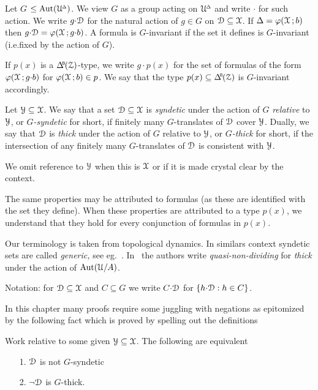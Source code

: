 Let \emph{$G$\/} $\le{\rm Aut}(\EuScript U\kern-.2ex^{\scriptscriptstyle\Delta})$.
We view $G$ as a group acting on $\EuScript U\kern-.2ex^{\scriptscriptstyle\Delta}$ and write ${\cdot}$ for such action.
We write $g{\cdot}\EuScript D$ for the natural action of $g\in G$ on $\EuScript D\subseteq\EuScript X$.
If $\Delta=\varphi(\EuScript X\,;b)$ then $g{\cdot}\EuScript D=\varphi(\EuScript X\,;g{\cdot}b)$.
A formula is $G$-invariant if the set it defines is $G$-invariant (i.e.\@ fixed by the action of $G$).

If $p(x)$ is a $\BDelta(\Z)$-type, we write $g{\cdot}p(x)$ for the set of formulas of the form $\varphi(\EuScript X\,;g{\cdot}b)$ for $\varphi(\EuScript X\,;b)\in p$.
We say that the type $p(x)\subseteq\BDelta(\Z)$ is $G$-invariant accordingly.

Let $\EuScript Y\subseteq\EuScript X$.
We say that a set $\EuScript D\subseteq\EuScript X$ is \emph{syndetic\/} under the action of $G$ \emph{relative\/} to $\EuScript Y$, or \emph{$G$-syndetic\/} for short, if finitely many $G$-translates of $\EuScript D$ cover $\EuScript Y$.
Dually, we say that $\EuScript D$ is \emph{thick\/} under the action of $G$ relative to $\EuScript Y$, or \emph{$G$-thick\/} for short, if the intersection of any finitely many $G$-translates of $\EuScript D$ is consistent with $\EuScript Y$.

We omit reference to $\EuScript Y$ when this is $\EuScript X$ or if it is made crystal clear by the context.

The same properties may be attributed to formulas (as these are identified with the set they define).
When these properties are attributed to a type $p(x)$, we understand that they hold for every conjunction of formulas in $p(x)$.

Our terminology is taken from topological dynamics.
In similars context syndetic sets are called \textit{generic,} see eg.~\cite{Ne}.
In~\cite{CK} the authors write \textit{quasi-non-dividing\/} for \textit{thick\/} under the action of ${\rm Aut}(\EuScript U/A)$.

Notation: for $\EuScript D\subseteq\EuScript X$ and $C\subseteq G$ we write \emph{$C{\cdot}\EuScript D$\/} for $\{h{\cdot}\EuScript D: h\in C\}$.

In this chapter many proofs require some juggling with negations as epitomized by the following fact which is proved by spelling out the definitions

\begin{fact}\label{fact_fip}
  Work relative to some given $\EuScript Y\subseteq\EuScript X$.
  The following are equivalent
  \begin{itemize}
    \item[1.] $\EuScript D$ is not $G$-syndetic
    \item[2.] $\neg\EuScript D$ is $G$-thick.
  \end{itemize}\smallskip
\end{fact}

